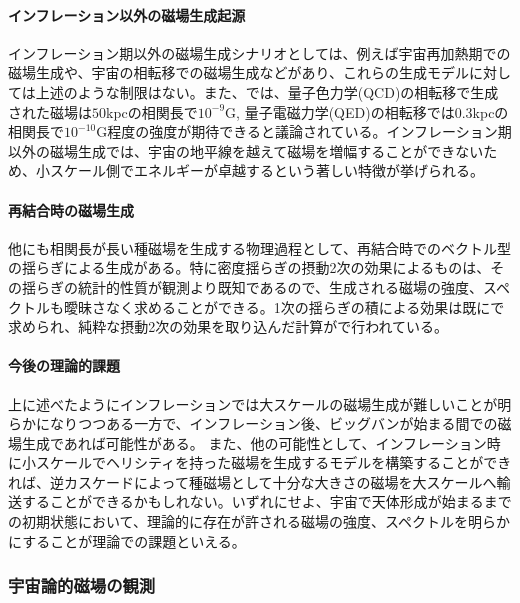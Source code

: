 \paragraph{インフレーション以外の磁場生成起源}

インフレーション期以外の磁場生成シナリオとしては、例えば宇宙再加熱期での磁場生成\citep{2014JCAP...05..040K}や、宇宙の相転移での磁場生成\citep{1983PhRvL..51.1488H,1991PhLB..265..258V}などがあり、これらの生成モデルに対しては上述のような制限はない。また、\cite{2013PhRvD..87h3007K}では、量子色力学(QCD)の相転移で生成された磁場は$50$kpcの相関長で$10^{-9}$G, 量子電磁力学(QED)の相転移では$0.3$kpcの相関長で$10^{-10}$G程度の強度が期待できると議論されている。インフレーション期以外の磁場生成では、宇宙の地平線を越えて磁場を増幅することができないため、小スケール側でエネルギーが卓越するという著しい特徴が挙げられる。

\paragraph{再結合時の磁場生成}

他にも相関長が長い種磁場を生成する物理過程として、再結合時でのベクトル型の揺らぎによる生成がある\citep{2005PhRvL..95l1301T}。特に密度揺らぎの摂動2次の効果によるものは、その揺らぎの統計的性質が観測より既知であるので、生成される磁場の強度、スペクトルも曖昧さなく求めることができる。1次の揺らぎの積による効果は既に\cite{2006Sci...311..827I}で求められ、純粋な摂動2次の効果を取り込んだ計算が\cite{1405.4810}で行われている。

\paragraph{今後の理論的課題}

上に述べたようにインフレーションでは大スケールの磁場生成が難しいことが明らかになりつつある一方で、インフレーション後、ビッグバンが始まる間での磁場生成であれば可能性がある\citep{2014JCAP...05..040K}。 また、他の可能性として、インフレーション時に小スケールでヘリシティを持った磁場を生成するモデルを構築することができれば、逆カスケードによって種磁場として十分な大きさの磁場を大スケールへ輸送することができるかもしれない。いずれにせよ、宇宙で天体形成が始まるまでの初期状態において、理論的に存在が許される磁場の強度、スペクトルを明らかにすることが理論での課題といえる。

\subsubsection{宇宙論的磁場の観測}
\label{c06.s1.ss7.sss3}

